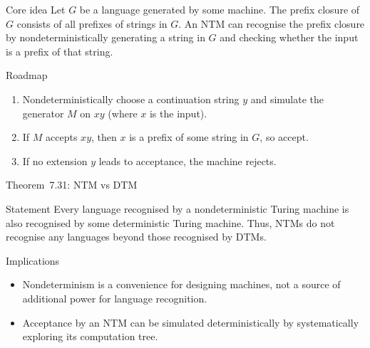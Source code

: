 \begin{frame}[t]{}
  \begin{tblock}{Core idea}
    Let $G$ be a language generated by some machine.  The prefix
    closure of $G$ consists of all prefixes of strings in $G$.  An
    NTM can recognise the prefix closure by nondeterministically
    generating a string in $G$ and checking whether the input is a
    prefix of that string.
  \end{tblock}
  \begin{tblock}{Roadmap}
    \begin{enumerate}
      \item Nondeterministically choose a continuation string $y$ and
        simulate the generator $M$ on $xy$ (where $x$ is the input).
      \item If $M$ accepts $xy$, then $x$ is a prefix of some string
        in $G$, so accept.
      \item If no extension $y$ leads to acceptance, the machine
        rejects.
    \end{enumerate}
  \end{tblock}
  \label{fr:7.7-05}
\end{frame}

\begin{frame}[t]{Theorem 7.31: NTM vs DTM}
  \begin{tblock}{Statement}
    Every language recognised by a nondeterministic Turing machine is
    also recognised by some deterministic Turing machine.  Thus, NTMs
    do not recognise any languages beyond those recognised by DTMs.
  \end{tblock}
  \begin{tblock}{Implications}
    \begin{itemize}
      \item Nondeterminism is a convenience for designing machines,
        not a source of additional power for language recognition.
      \item Acceptance by an NTM can be simulated deterministically by
        systematically exploring its computation tree.
    \end{itemize}
  \end{tblock}
  \label{fr:7.7-06}
\end{frame}

